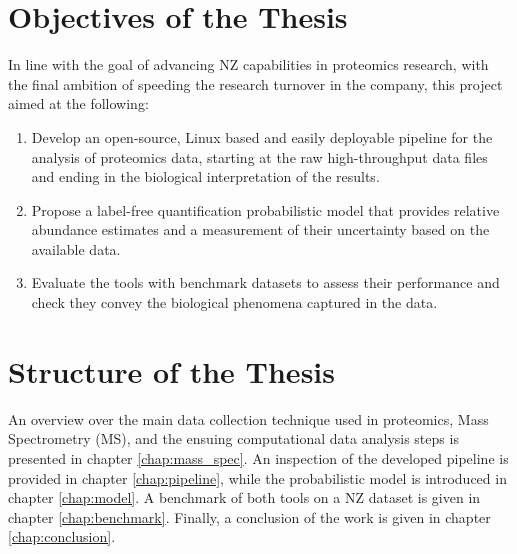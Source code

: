 \section{Objectives of the Thesis}
\label{sec:objectives}

In line with the goal of advancing \ac{NZ} capabilities in proteomics research, with the final ambition of speeding the research turnover in the company, this project aimed at the following:

\begin{enumerate}

\item Develop an open-source, Linux based and easily deployable pipeline for the analysis of proteomics data, starting at the raw high-throughput data files and ending in the  biological interpretation of the results.

\item Propose a label-free quantification probabilistic model that provides relative abundance estimates and a measurement of their uncertainty based on the available data.


\item Evaluate the tools with benchmark datasets to assess their performance and check they convey the biological phenomena captured in the data.



\end{enumerate}

\section{Structure of the Thesis}

An overview over the main data collection technique used in proteomics, Mass Spectrometry (\ac{MS}), and the ensuing computational data analysis steps is presented in chapter \ref{chap:mass_spec}. An inspection of the developed pipeline is provided in chapter \ref{chap:pipeline}, while the probabilistic model is introduced in chapter \ref{chap:model}. A benchmark of both tools on a \ac{NZ} dataset is given in chapter \ref{chap:benchmark}. Finally, a conclusion of the work is given in chapter \ref{chap:conclusion}.